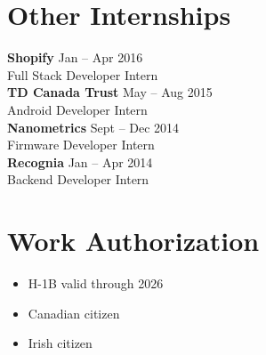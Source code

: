\documentclass[letterpaper,10pt]{article}
\newcommand{\comment}[1]{}
\newcommand{\tinytitle}[4]{
    {\large \textbf{#1}}
    \hfill
    {\footnotesize#4}
    \\
    #2
    \\
}
\begin{document}
\begin{minipage}[t]{0.34\textwidth}
\medskip
\section{Other Internships}
\medskip

\tinytitle{Shopify}{Full Stack Developer Intern}{Ruby on Rails, MySQL}{Jan -- Apr 2016}
\comment{
\begin{itemize}
    \item {Created mobile phone payment method for merchants in developing countries, especially those with low credit card penetration}
    \item {Created Postmates and UberRush local delivery integrations}
\end{itemize}
\bigskip
}

\tinytitle{TD Canada Trust}{Android Developer Intern}{Java, AngularJS}{May -- Aug 2015}
\comment{
\begin{itemize}
    \item{Prototyped Android apps to explore new technologies applied to banking (e.g. internet of things)}
\end{itemize}
\bigskip
}

\tinytitle{Nanometrics}{Firmware Developer Intern}{C++, bash}{Sept -- Dec 2014}
\comment{
\begin{itemize}
    \item {Developed firmware for seismometers}
    \item {Verified \& debugged prototype PCBs}
\end{itemize}
\bigskip
}


\tinytitle{Recognia}{Backend Developer Intern}{Java, Perl, PostgreSQL, AngularJS}{Jan -- Apr 2014}
\comment{
{\footnotesize
 \hfill Jan  -- Apr 2014\\
}
\begin{itemize}
    \item{Built backend and API for website for technical analysis of financial instruments}
    \item{Created new caching strategy, reducing cache misses by 60\%}
\end{itemize}
}

\medskip
\section{Work Authorization}
\begin{itemize}[leftmargin=0.125in]
    \item{H-1B valid through 2026}
    \item{Canadian citizen}
    \item{Irish citizen}

\end{itemize}

\end{minipage}
\end{document}
